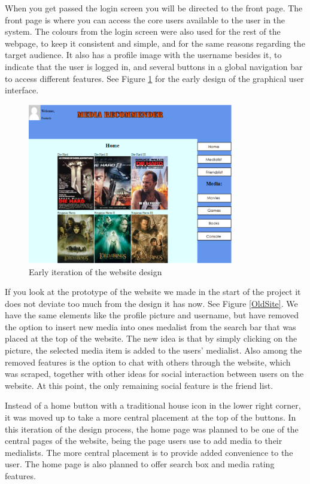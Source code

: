When you get passed the login screen you will be directed to the front page. The front page is where you can access the core users available to the user in the system. The colours from the login screen were also used for the rest of the webpage, to keep it consistent and simple, and for the same reasons regarding the target audience. It also has a profile image with the username besides it, to indicate that the user is logged in, and several buttons in a global navigation bar to access different features. See Figure \ref{CurrSite} for the early design of the graphical user interface.

\begin{figure}[htb]
\centering
\includegraphics[width=0.8\textwidth]{Images/CurrSite.png}
\caption{Early iteration of the website design}
\label{CurrSite}
\end{figure}


If you look at the prototype of the website we made in the start of the project it does not deviate too much from the design it has now. See Figure \ref{OldSite}. We have the same elements like the profile picture and username, but have removed the option to insert new media into ones medalist from the search bar that was placed at the top of the website. The new idea is that by simply clicking on the picture, the selected media item is added to the users’ medialist. Also among the removed features is the option to chat with others through the website, which was scraped, together with other ideas for social interaction between users on the website. At this point, the only remaining social feature is the friend list. 

Instead of a home button with a traditional house icon in the lower right corner, it was moved up to take a more central placement at the top of the buttons. In this iteration of the design process, the home page was planned to be one of the central pages of the website, being the page users use to add media to their medialists. The more central placement is to provide added convenience to the user. The home page is also planned to offer search box and media rating features.

